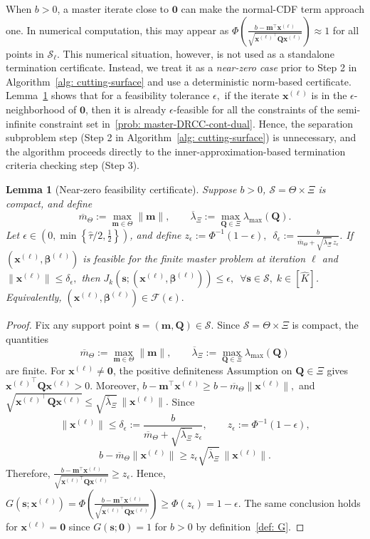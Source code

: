 \documentclass[opre,sglanonrev]{informs4}
\newtheorem{lemma}{Lemma}
\newcommand{\mF}{\mathcal{F}}
\newcommand{\mS}{\mathcal{S}}
\newcommand{\bbeta}{\bm{\beta}}
\newcommand{\bzero}{\bm{0}}
\newcommand{\bmean}{\bm{m}}
\newcommand{\bs}{\bm{s}}
\newcommand{\bx}{\bm{x}}
\newcommand{\bQ}{\bm Q}
\begin{document}
{When $b>0$, a master iterate close to $\bzero$ can make the normal-CDF term approach one. In numerical computation, this may appear as $\Phi\!\left(
\frac{b-\bmean^\top \bx^{(\ell)}}
{\sqrt{{\bx^{(\ell)}}^\top\bQ\bx^{(\ell)}}}
\right) \approx 1$ for all points in $\mS_\ell$. This numerical situation, however, is not used as a standalone termination certificate. Instead, we
treat it as a \emph{near-zero case} prior to Step 2 in Algorithm~\ref{alg: cutting-surface} and use a deterministic norm-based certificate.
Lemma~\ref{lem:near-zero-certificate} shows that for a feasibility
tolerance $\epsilon,$ if the iterate $\bx^{(\ell)}$ is in the $\epsilon$-neighborhood
of $\bzero$, then it is already $\epsilon$-feasible for all the constraints of the semi-infinite constraint set in~\eqref{prob: master-DRCC-cont-dual}. Hence, the separation subproblem step (Step 2 in Algorithm~\ref{alg: cutting-surface}) is
unnecessary, and the algorithm proceeds directly to the inner-approximation-based termination criteria checking step (Step 3).

\begin{lemma}[Near-zero feasibility certificate]
\label{lem:near-zero-certificate}
Suppose $b>0$, $\mS=\Theta\times\Xi$ is compact, and define
\[
\overline{m}_\Theta:=\max_{\bmean\in\Theta}\|\bmean\|,
\qquad
\overline{\lambda}_\Xi
:=
\max_{\bQ\in\Xi}\lambda_{\max}(\bQ).
\]
Let $\epsilon \in  (0, \min\left\{\hat{\tau}/2,\frac12\right\})$, and define $z_\epsilon
:=\Phi^{-1}(1-\epsilon),
\,\,\,
\delta_{\epsilon}
:=
\frac{b}{\overline{m}_\Theta+\sqrt{\overline{\lambda}_\Xi}\,z_\epsilon}$.
If $(\bx^{(\ell)},\bbeta^{(\ell)})$ is feasible for the finite master problem
at iteration $\ell$ and $\|\bx^{(\ell)}\|\le\delta_{\epsilon},$
then $J_k(\bs;(\bx^{(\ell)},\bbeta^{(\ell)}))\le\epsilon,
\,\,\,
\forall \bs\in\mS,\; k\in[\hat K]$. 
Equivalently, $(\bx^{(\ell)},\bbeta^{(\ell)})\in\mF(\epsilon).$
\end{lemma}
\begin{proof}
    
Fix any support point $\bs=(\bmean,\bQ)\in\mS$. Since
$\mS=\Theta\times\Xi$ is compact, the quantities
\[
\overline{m}_\Theta:=\max_{\bmean\in\Theta}\|\bmean\|,
\qquad
\overline{\lambda}_\Xi
:=
\max_{\bQ\in\Xi}\lambda_{\max}(\bQ)
\]
are finite. For $\bx^{(\ell)}\neq\bzero$, the  positive definiteness Assumption
on $\bQ\in\Xi$ gives ${\bx^{(\ell)}}^\top\bQ\bx^{(\ell)}>0.$ Moreover, $b-\bmean^\top\bx^{(\ell)}
\ge
b-\overline{m}_\Theta\|\bx^{(\ell)}\|,$
and $\sqrt{{\bx^{(\ell)}}^\top\bQ\bx^{(\ell)}}
\le
\sqrt{\overline{\lambda}_\Xi}\,\|\bx^{(\ell)}\|.$ 
Since
\[
\|\bx^{(\ell)}\|\le\delta_{\epsilon}
:=
\frac{b}{\overline{m}_\Theta+\sqrt{\overline{\lambda}_\Xi}\,z_\epsilon},
\qquad
z_\epsilon:=\Phi^{-1}(1-\epsilon),
\]
\[
b-\overline{m}_\Theta\|\bx^{(\ell)}\|
\ge
z_\epsilon\sqrt{\overline{\lambda}_\Xi}\,\|\bx^{(\ell)}\|.
\]
Therefore, $\frac{b-\bmean^\top\bx^{(\ell)}}
{\sqrt{{\bx^{(\ell)}}^\top\bQ\bx^{(\ell)}}}
\ge
z_\epsilon.$ Hence, $G(\bs;\bx^{(\ell)})
=
\Phi\!\left(
\frac{b-\bmean^\top\bx^{(\ell)}}
{\sqrt{{\bx^{(\ell)}}^\top\bQ\bx^{(\ell)}}}
\right)
\ge
\Phi(z_\epsilon)
=
1-\epsilon.$
The same conclusion holds for $\bx^{(\ell)}=\bzero$ since $G(\bs;\bzero)=1$ for $b>0$ by definition~\eqref{def: G}.


\end{proof}}
\end{document}

